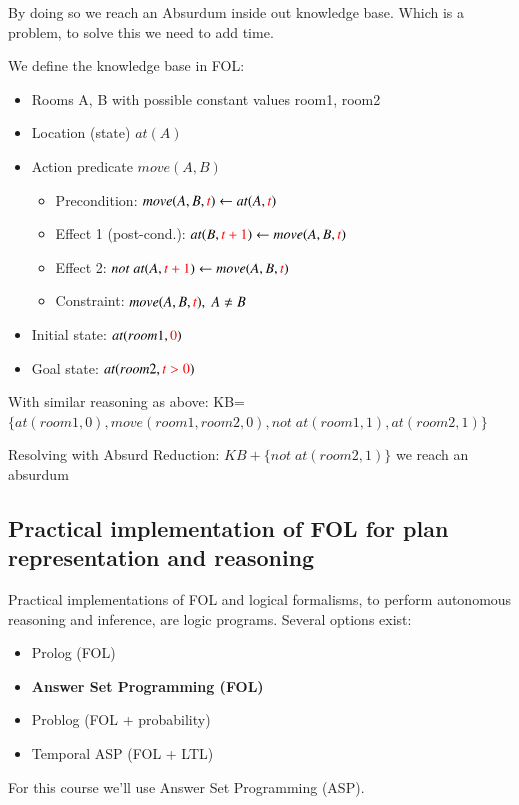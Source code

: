 By doing so we reach an Absurdum inside out knowledge base. Which is a problem, to solve this we need to add time.
\vspace{0.5cm}

We define the knowledge base in FOL:
\begin{itemize}
    \item Rooms A, B with possible constant values room1, room2
    \item Location (state) $at(A)$
    \item Action predicate $move(A, B)$
    \begin{itemize}
        \item Precondition: $move(A, B, \textcolor{red}{t}) \leftarrow at(A, \textcolor{red}{t})$
        \item Effect 1 (post-cond.): $at(B, \textcolor{red}{t+1}) \leftarrow move(A, B, \textcolor{red}{t})$
        \item Effect 2: $not\;at(A, \textcolor{red}{t+1}) \leftarrow move(A, B, \textcolor{red}{t})$
        \item Constraint: $move(A, B, \textcolor{red}{t}),\;A \ne B$
    \end{itemize}
    \item Initial state: $at(room1, \textcolor{red}{0})$
    \item Goal state: $at(room2, \textcolor{red}{t>0})$
\end{itemize}
With similar reasoning as above:
KB=$\{at(room1, 0), move(room1,room2, 0), not\;at(room1, 1), at(room2, 1)\}$

Resolving with Absurd Reduction: $KB + \{not\;at(room2, 1)\}$ we reach an absurdum

\subsection{Practical implementation of FOL for plan representation and reasoning}
Practical implementations of FOL and logical formalisms, to perform autonomous reasoning and inference, are logic programs.
Several options exist:
\begin{itemize}
    \item Prolog (FOL)
    \item \textbf{Answer Set Programming (FOL)}
    \item Problog (FOL + probability)
    \item Temporal ASP (FOL + LTL)
\end{itemize}
For this course we'll use Answer Set Programming (ASP).
